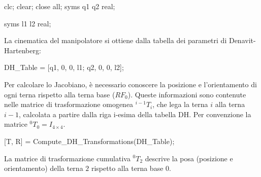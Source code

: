 \documentclass[11pt, a4paper]{article}
\begin{document}
\begin{matlabcode}
clc; clear; close all;
syms q1 q2 real;

syms l1 l2 real;
\end{matlabcode}

\begin{par}
\begin{flushleft}
La cinematica del manipolatore si ottiene dalla tabella dei parametri di Denavit-Hartenberg:
\end{flushleft}
\end{par}

\begin{matlabcode}
DH_Table = [q1, 0, 0, l1;
            q2, 0, 0, l2];
\end{matlabcode}

\begin{par}
\begin{flushleft}
Per calcolare lo Jacobiano, è necessario conoscere la posizione e l'orientamento di ogni terna rispetto alla terna base ($RF_0$). Queste informazioni sono contenute nelle matrice di trasformazione omogenea $^{i-1} T_i$, che lega la terna $i$ alla terna $i-1$, calcolata a partire dalla riga i-esima della tabella DH. Per convenzione la matrice $^0 T_0 =I_{4\times 4}$.
\end{flushleft}
\end{par}

\begin{matlabcode}
[T, R] = Compute_DH_Transformations(DH_Table);
\end{matlabcode}

\begin{par}
\begin{flushleft}
La matrice di trasformazione cumulativa $^0 T_2$ descrive la posa (posizione e orientamento) della terna $2$ rispetto alla terna base $0$.
\end{flushleft}
\end{par}
\end{document}
